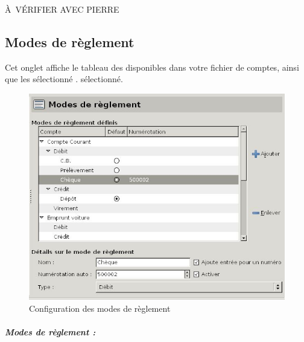 À VÉRIFIER AVEC PIERRE

\subsection{Modes de règlement\label{setup-resources-modes}}


Cet onglet affiche le tableau des  disponibles dans votre fichier de comptes, ainsi que les 
\ifIllustration sélectionné . 
\else sélectionné.






\fi



\ifIllustration
\begin{figure}[ht]
\begin{center}
\includegraphics[scale=0.5]{image/screenshot/setup_modes}
\end{center}
\caption{Configuration des modes de règlement}
\label{setup-modes-img}
\end{figure}
\fi

\subparagraph{Modes de règlement :\label{setup-resources-modes-list}}




